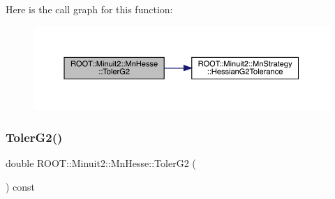 Here is the call graph for this function\+:
\nopagebreak
\begin{figure}[H]
\begin{center}
\leavevmode
\includegraphics[width=350pt]{d1/d02/classROOT_1_1Minuit2_1_1MnHesse_ae625b94360c1c974854b63aedbcc6a1a_cgraph}
\end{center}
\end{figure}
\mbox{\label{classROOT_1_1Minuit2_1_1MnHesse_ae625b94360c1c974854b63aedbcc6a1a}} 
\subsubsection{\texorpdfstring{TolerG2()}{TolerG2()}\hspace{0.1cm}{\footnotesize\ttfamily [2/2]}}
{\footnotesize\ttfamily double R\+O\+O\+T\+::\+Minuit2\+::\+Mn\+Hesse\+::\+Toler\+G2 (\begin{DoxyParamCaption}{ }\end{DoxyParamCaption}) const\hspace{0.3cm}{\ttfamily [inline]}}

